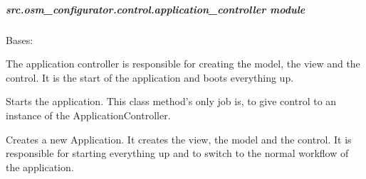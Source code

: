 \documentclass[letterpaper,10pt,english]{sphinxmanual}
\begin{document}
\subparagraph{src.osm\_configurator.control.application\_controller module}
\label{\detokenize{apidoc/src.osm_configurator.control:module-src.osm_configurator.control.application_controller}}\label{\detokenize{apidoc/src.osm_configurator.control:src-osm-configurator-control-application-controller-module}}

\begin{fulllineitems}
\label{\detokenize{apidoc/src.osm_configurator.control:src.osm_configurator.control.application_controller.ApplicationController}}
\pysigstartsignatures
{}
\pysigstopsignatures
\sphinxAtStartPar
Bases: 

\sphinxAtStartPar
The application controller is responsible for creating the model, the view and the control. It is the start of the
application and boots everything up.

\begin{fulllineitems}
\label{\detokenize{apidoc/src.osm_configurator.control:src.osm_configurator.control.application_controller.ApplicationController.main}}
\pysigstartsignatures
{}
\pysigstopsignatures
\sphinxAtStartPar
Starts the application.
This class method’s only job is, to give control to an instance of the ApplicationController.

\end{fulllineitems}


\begin{fulllineitems}
\label{\detokenize{apidoc/src.osm_configurator.control:src.osm_configurator.control.application_controller.ApplicationController.__init__}}
\pysigstartsignatures
{}
\pysigstopsignatures
\sphinxAtStartPar
Creates a new Application. It creates the view, the model and the control. It is responsible for starting
everything up and to switch to the normal workflow of the application.

\end{fulllineitems}


\end{fulllineitems}
\end{document}
